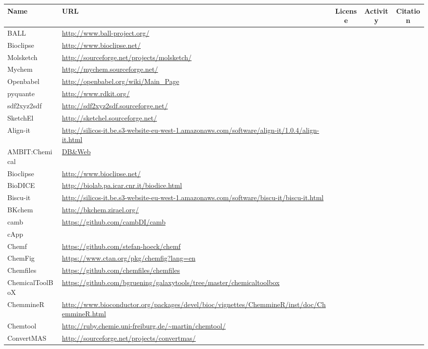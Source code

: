 \begin{table} 
    \begin{tabular}{ l l c c c  }
    Name & URL & License & Activity & Citation \\ \hline
BALL & \url{http://www.ball-project.org/} & & & \\
Bioclipse & \url{http://www.bioclipse.net/} & & & \\
Molsketch & \url{http://sourceforge.net/projects/molsketch/} & & & \\
Mychem & \url{http://mychem.sourceforge.net/} & & & \\
Openbabel & \url{http://openbabel.org/wiki/Main_Page} & & & \\
pyquante & \url{http://www.rdkit.org/} & & & \\
sdf2xyz2sdf & \url{http://sdf2xyz2sdf.sourceforge.net/} & & & \\
SketchEl & \url{http://sketchel.sourceforge.net/} & & & \\
Align-it & \url{http://silicos-it.be.s3-website-eu-west-1.amazonaws.com/software/align-it/1.0.4/align-it.html} & & & \\
AMBIT:Chemical & \url{DB&Web} & & & \\
Bioclipse & \url{http://www.bioclipse.net/} & & & \\
BioDICE & \url{http://biolab.pa.icar.cnr.it/biodice.html} & & & \\
Biscu-it & \url{http://silicos-it.be.s3-website-eu-west-1.amazonaws.com/software/biscu-it/biscu-it.html} & & & \\
BKchem & \url{http://bkchem.zirael.org/} & & & \\
camb & \url{https://github.com/cambDI/camb} & & & \\
cApp & \url{} & & & \\
Chemf & \url{https://github.com/stefan-hoeck/chemf} & & & \\
ChemFig & \url{https://www.ctan.org/pkg/chemfig?lang=en} & & & \\
Chemfiles & \url{https://github.com/chemfiles/chemfiles} & & & \\
ChemicalToolBoX & \url{https://github.com/bgruening/galaxytools/tree/master/chemicaltoolbox} & & & \\
ChemmineR & \url{http://www.bioconductor.org/packages/devel/bioc/vignettes/ChemmineR/inst/doc/ChemmineR.html} & & & \\
Chemtool & \url{http://ruby.chemie.uni-freiburg.de/~martin/chemtool/} & & & \\
ConvertMAS & \url{http://sourceforge.net/projects/convertmas/} & & & \\

\end{tabular}
\end{table}
